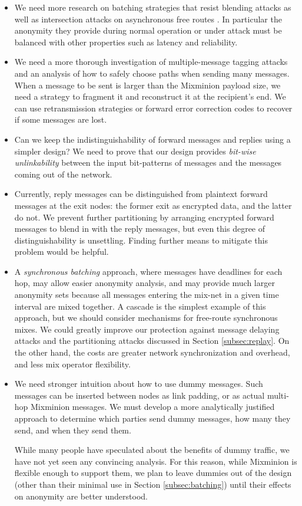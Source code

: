 \documentclass[times,10pt,twocolumn]{article}
\begin{document}
\begin{itemize}
\item We need more research on batching strategies that resist blending
attacks \cite{trickle02} as well as intersection
attacks on asynchronous free routes \cite{disad-free-routes}. In
particular the anonymity they provide during normal operation or
under attack must be balanced with other properties such as latency
and reliability.
\item We need a more thorough investigation of multiple-message tagging
attacks and an analysis of how to safely choose paths when
sending many messages. When a message to be sent is larger than the
Mixminion payload size, we need a strategy to fragment
it and reconstruct it at the recipient's end. 
We can use retransmission strategies or forward error
correction codes to recover if some messages are lost.
\item Can we keep the indistinguishability of forward messages and
replies using a simpler design? We need to prove that our design provides
\emph{bit-wise unlinkability} between the input bit-patterns of messages
and the messages coming out of the network.
\item Currently, reply messages can be distinguished from plaintext forward
messages at the exit nodes: the former exit as encrypted data, and the
latter do not.  We prevent further partitioning by arranging 
encrypted forward messages to blend in with the reply messages, but even this
degree of distinguishability is unsettling.  Finding further means to
mitigate this problem would be helpful.
\item A \emph{synchronous batching} approach, where messages have
deadlines for each hop, may allow easier anonymity analysis, and may
provide much larger anonymity sets because all messages entering the
mix-net in a given time interval are mixed together. A cascade is the
simplest example of this approach, but we should consider mechanisms for
free-route synchronous mixes. We could greatly improve our protection
against message delaying attacks and the partitioning attacks discussed
in Section \ref{subsec:replay}. On the other hand, the costs are greater
network synchronization and overhead, and less mix operator flexibility.
\item We need stronger intuition about how to use dummy messages. Such
messages can be inserted between nodes as link padding, or as
actual multi-hop Mixminion messages. We must develop a more analytically
justified approach to determine which parties send dummy messages, how many
they send, and when they send them.

\quad While many people have speculated about the benefits of dummy traffic,
we have not yet seen any convincing analysis. For this reason, while
Mixminion is flexible enough to support them, we plan to leave dummies
out of the design (other than their minimal use in Section
\ref{subsec:batching}) until their effects on anonymity are better
understood.
\end{itemize}
\end{document}
